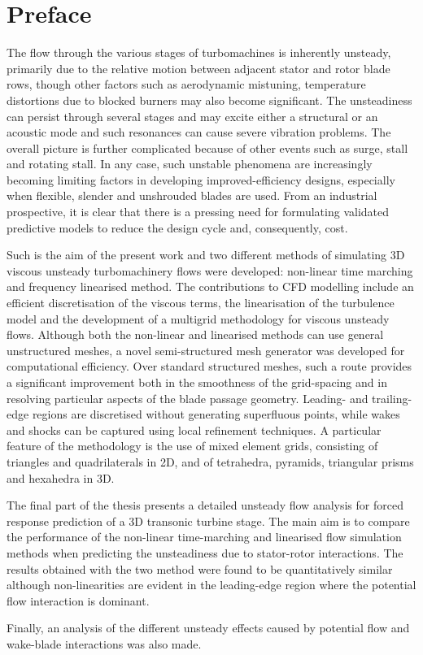 %
%
%
%
%
\chapter*{Preface}
%
 The flow through the various stages of turbomachines is inherently unsteady,
 primarily due to the relative motion between adjacent stator and rotor
 blade rows, though other factors such as aerodynamic mistuning, temperature
 distortions due to blocked burners may also become significant. The
 unsteadiness can persist through several stages and may excite either a
 structural or an acoustic mode and such resonances can cause  severe
 vibration problems.  The overall picture is further complicated because of
 other events such as surge, stall and rotating stall. In any case, such
 unstable phenomena are increasingly becoming limiting factors in developing
 improved-efficiency designs, especially when flexible,
 slender and unshrouded blades are used.
 From an industrial prospective, it is clear that there is a
 pressing need for formulating validated predictive models to reduce
 the design cycle and, consequently, cost.

 Such is the aim of the present
 work and two different methods of simulating 3D viscous unsteady
 turbomachinery flows were developed: non-linear time marching and
 frequency linearised method. The contributions to CFD modelling include an
 efficient discretisation of the viscous terms, the linearisation of the
 turbulence model and the development of a multigrid methodology for viscous
 unsteady flows. Although both the non-linear and linearised methods can use
 general unstructured meshes, a novel semi-structured mesh generator was
 developed  for computational efficiency. Over standard structured meshes,
 such a route provides a significant improvement
 both in the smoothness of the grid-spacing and in resolving
 particular aspects of the blade passage geometry. Leading-
 and trailing-edge regions are discretised without generating
 superfluous points, while wakes and shocks can be
 captured using local refinement techniques.
 A particular feature of the methodology is the use of mixed element grids,
 consisting of triangles
 and quadrilaterals in 2D, and of tetrahedra, pyramids, triangular
 prisms and hexahedra in 3D.

 The final part of the thesis presents a detailed unsteady flow analysis
 for forced response prediction of a 3D transonic turbine stage.
 The main aim is to compare the performance of the non-linear
 time-marching and linearised flow simulation methods when predicting
 the unsteadiness due to stator-rotor interactions.
 The results obtained with the two method were found to be quantitatively
 similar although non-linearities are evident in the leading-edge
 region where the potential flow interaction is dominant.

 Finally, an analysis of the different unsteady effects caused by potential flow
 and wake-blade interactions was also made.
